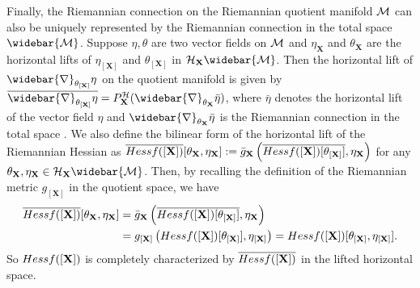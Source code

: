 \documentclass[11pt]{article}
\newcommand{\cH}{\mathcal{H}}
\newcommand{\0}{{\mathbf{0}}}
\newcommand{\1}{{\mathbf{1}}}
\newcommand{\X}{{\mathbf{X}}}
\newcommand{\cM}{{\cal M}}
\newcommand{\Hess}{{\rm Hess}}
\begin{document}
Finally, the Riemannian connection on the Riemannian quotient manifold $\cM$ can also be uniquely represented by the Riemannian connection in the total space $\widebar{\cM}$. Suppose $\eta, \theta$ are two vector fields on $\cM$ and $\eta_\X$ and $\theta_\X$ are the horizontal lifts of $\eta_{[\X]}$ and $\theta_{[\X]}$ in $\cH_\X\widebar{\cM}$. Then the horizontal lift of $\widebar{\nabla}_{\theta_{[\X]}} \eta$ on the quotient manifold is given by $ \overline{ \widebar{\nabla}_{\theta_{[\X]}} \eta } = P_\X^{\cH} ( \widebar{\nabla}_{\theta_\X} \bar{\eta}  ) $, where $\bar{\eta}$ denotes the horizontal lift of the vector field $\eta$ and $\widebar{\nabla}_{\theta_\X} \bar{\eta}$ is the Riemannian connection in the total space \cite[Proposition 5.3.3]{absil2009optimization}. We also define the bilinear form of the horizontal lift of the Riemannian Hessian as $\overline{\Hess f([\X])} [\theta_{\X}, \eta_\X ] := \bar{g}_\X\left( \overline{\Hess f([\X])[\theta_{[\X]}]}, \eta_\X \right) $ for any $\theta_\X, \eta_\X \in \cH_\X \widebar{\cM}$. Then, by recalling the definition of the Riemannian metric $g_{[\X]}$ in the quotient space, we have
\begin{equation} \label{eq:Hessian-lift-property}
	\begin{split}
		\overline{\Hess f([\X])} [\theta_{\X}, \eta_\X ] &= \bar{g}_\X\left(\overline{\Hess f([\X])[\theta_{[\X]}]}, \eta_\X \right)\\
		& = g_{[\X]} \left( \Hess f([\X])[\theta_{[\X]}], \eta_{[\X]}  \right) = \Hess f([\X])[\theta_{[\X]}, \eta_{[\X]}].
	\end{split}
\end{equation} 
So $\Hess f([\X])$ is completely characterized by $\overline{\Hess f([\X])}$ in the lifted horizontal space. 






\end{document}

